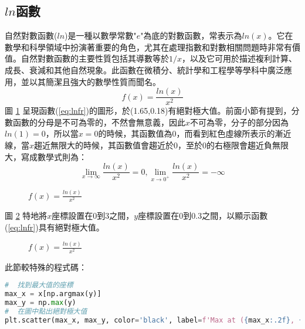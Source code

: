 \subsection{$ln$函數}
自然對數函數($ln$)是一種以數學常數"$e$"為底的對數函數，常表示為$ln(x)$。它在數學和科學領域中扮演著重要的角色，尤其在處理指數和對數相關問題時非常有價值。自然對數函數的主要性質包括其導數等於$1/x$，以及它可用於描述複利計算、成長、衰減和其他自然現象。此函數在微積分、統計學和工程學等學科中廣泛應用，並以其簡潔且強大的數學性質而聞名。
\begin{equation}\label{eq:lnfr}
f(x)= \frac{ln (x)}{x^2}
\end{equation}
圖 \ref{fig:lnfr_1} 呈現函數(\ref{eq:lnfr})的圖形，於(1.65,0.18)有絕對極大值。前面小節有提到，分數函數的分母是不可為零的，不然會無意義，因此$x$不可為零，分子的部分因為$ln(1)=0$，所以當$x=0$的時候，其函數值為0，而看到紅色虛線所表示的漸近線，當$x$趨近無限大的時候，其函數值會趨近於0，至於0的右極限會趨近負無限大，寫成數學式則為：
$$\lim_{x \rightarrow \infty}\frac{ln(x)}{x^2}=0,\lim_{x \rightarrow 0^+}\frac{ln(x)}{x^2}=-\infty$$
\begin{figure}[H]
    \caption{$f(x) = \frac{ln(x)}{x^2}$}
    \label{fig:lnfr_1}
\end{figure}
圖 \ref{fig:lnfr_2} 特地將$x$座標設置在0到3之間，$y$座標設置在0到0.3之間，以顯示函數(\ref{eq:lnfr})具有絕對極大值。
\begin{figure}[H]
    \caption{$f(x) = \frac{ln(x)}{x^2}$}
    \label{fig:lnfr_2}
\end{figure}
此節較特殊的程式碼：
\begin{lstlisting}[language=Python]
#  找到最大值的座標
max_x = x[np.argmax(y)]
max_y = np.max(y)
#  在圖中點出絕對極大值
plt.scatter(max_x, max_y, color='black', label=f'Max at ({max_x:.2f}, {max_y:.2f})', zorder=5)
\end{lstlisting}
